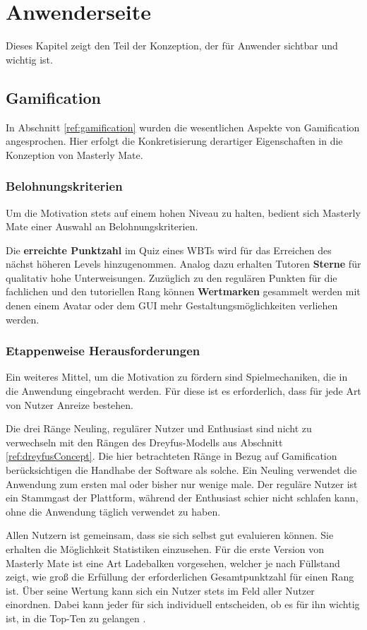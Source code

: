 \chapter{Anwenderseite}
Dieses Kapitel zeigt den Teil der Konzeption, der für Anwender sichtbar und
wichtig ist.

\section{Gamification}\label{ref:gamificationConcept}
In Abschnitt \ref{ref:gamification} wurden die wesentlichen Aspekte von
Gamification angesprochen. Hier erfolgt die Konkretisierung derartiger
Eigenschaften in die Konzeption von Masterly Mate.

\subsection{Belohnungskriterien}
Um die Motivation stets auf einem hohen Niveau zu halten, bedient sich Masterly
Mate einer Auswahl an Belohnungskriterien.

Die \textbf{erreichte Punktzahl} im Quiz eines WBTs wird für das Erreichen des
nächst höheren Levels hinzugenommen. Analog dazu erhalten Tutoren
\textbf{Sterne} für qualitativ hohe Unterweisungen. Zuzüglich zu den regulären
Punkten für die fachlichen und den tutoriellen Rang können \textbf{Wertmarken}
gesammelt werden mit denen einem Avatar oder dem \ac{GUI} mehr
Gestaltungsmöglichkeiten verliehen werden.

\subsection{Etappenweise Herausforderungen}
Ein weiteres Mittel, um die Motivation zu fördern sind Spielmechaniken, die in
die Anwendung eingebracht werden. Für diese ist es erforderlich, dass für jede
Art von Nutzer Anreize bestehen. 

Die drei Ränge Neuling, regulärer Nutzer und Enthusiast sind nicht zu
verwechseln mit den Rängen des Dreyfus-Modells aus Abschnitt
\ref{ref:dreyfusConcept}. Die hier betrachteten Ränge in Bezug auf Gamification
berücksichtigen die Handhabe der Software als solche. Ein Neuling verwendet die
Anwendung zum ersten mal oder bisher nur wenige male. Der reguläre Nutzer ist
ein Stammgast der Plattform, während der Enthusiast schier nicht schlafen kann,
ohne die Anwendung täglich verwendet zu haben.

Allen Nutzern ist gemeinsam, dass sie sich selbst gut evaluieren können. Sie
erhalten die Möglichkeit Statistiken einzusehen. Für die erste Version von
Masterly Mate ist eine Art Ladebalken vorgesehen, welcher je nach Füllstand
zeigt, wie groß die Erfüllung der erforderlichen Gesamtpunktzahl für einen Rang
ist. Über seine Wertung kann sich ein Nutzer stets im Feld aller Nutzer
einordnen. Dabei kann jeder für sich individuell entscheiden, ob es für ihn
wichtig ist, in die Top-Ten zu gelangen \cite{grubenMerkeBabics:2012}.

